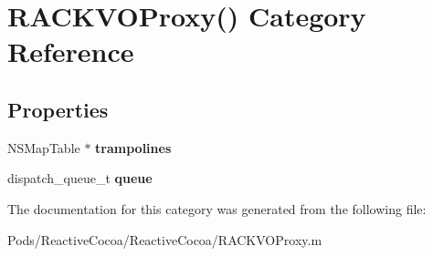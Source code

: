 \hypertarget{category_r_a_c_k_v_o_proxy_07_08}{}\section{R\+A\+C\+K\+V\+O\+Proxy() Category Reference}
\label{category_r_a_c_k_v_o_proxy_07_08}
\subsection*{Properties}
\begin{DoxyCompactItemize}
\item 
\mbox{\label{category_r_a_c_k_v_o_proxy_07_08_a21bc93f737d42adad65db0bd130a22e7}} 
N\+S\+Map\+Table $\ast$ {\bfseries trampolines}
\item 
\mbox{\label{category_r_a_c_k_v_o_proxy_07_08_a2ac7248c149df501c4f315583601b615}} 
dispatch\+\_\+queue\+\_\+t {\bfseries queue}
\end{DoxyCompactItemize}


The documentation for this category was generated from the following file\+:\begin{DoxyCompactItemize}
\item 
Pods/\+Reactive\+Cocoa/\+Reactive\+Cocoa/R\+A\+C\+K\+V\+O\+Proxy.\+m\end{DoxyCompactItemize}
